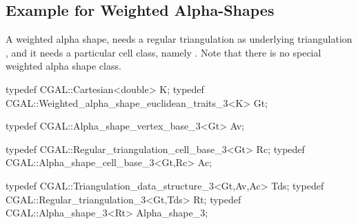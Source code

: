 
\subsection{Example for Weighted Alpha-Shapes\label{I1_SectWeightedAS3D}}

A weighted alpha shape, needs a regular triangulation as
underlying triangulation , and it needs a particular
cell class, namely .
Note that there is no special weighted alpha shape class.

\begin{cprog}
typedef CGAL::Cartesian<double> K;
typedef CGAL::Weighted_alpha_shape_euclidean_traits_3<K> Gt;

typedef CGAL::Alpha_shape_vertex_base_3<Gt> Av;

typedef CGAL::Regular_triangulation_cell_base_3<Gt> Rc;
typedef CGAL::Alpha_shape_cell_base_3<Gt,Rc>  Ac;

typedef CGAL::Triangulation_data_structure_3<Gt,Av,Ac> Tds;
typedef CGAL::Regular_triangulation_3<Gt,Tds> Rt;
typedef CGAL::Alpha_shape_3<Rt> Alpha_shape_3;
\end{cprog}
